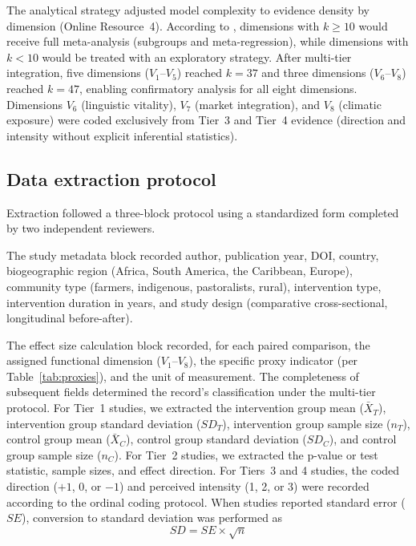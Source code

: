 \documentclass[12pt,a4paper]{article}
\begin{document}
The analytical strategy adjusted model complexity to evidence density by dimension (Online Resource~4). According to \citet{Borenstein2009}, dimensions with $k \geq 10$ would receive full meta-analysis (subgroups and meta-regression), while dimensions with $k < 10$ would be treated with an exploratory strategy. After multi-tier integration, five dimensions ($V_1$--$V_5$) reached $k = 37$ and three dimensions ($V_6$--$V_8$) reached $k = 47$, enabling confirmatory analysis for all eight dimensions. Dimensions $V_6$ (linguistic vitality), $V_7$ (market integration), and $V_8$ (climatic exposure) were coded exclusively from Tier~3 and Tier~4 evidence (direction and intensity without explicit inferential statistics).

\subsection{Data extraction protocol}
\label{sec:extraction}

Extraction followed a three-block protocol using a standardized form completed by two independent reviewers.

The study metadata block recorded author, publication year, DOI, country, biogeographic region (Africa, South America, the Caribbean, Europe), community type (farmers, indigenous, pastoralists, rural), intervention type, intervention duration in years, and study design (comparative cross-sectional, longitudinal before-after).

The effect size calculation block recorded, for each paired comparison, the assigned functional dimension ($V_1$--$V_8$), the specific proxy indicator (per Table~\ref{tab:proxies}), and the unit of measurement. The completeness of subsequent fields determined the record's classification under the multi-tier protocol. For Tier~1 studies, we extracted the intervention group mean ($\bar{X}_T$), intervention group standard deviation ($SD_T$), intervention group sample size ($n_T$), control group mean ($\bar{X}_C$), control group standard deviation ($SD_C$), and control group sample size ($n_C$). For Tier~2 studies, we extracted the p-value or test statistic, sample sizes, and effect direction. For Tiers~3 and 4 studies, the coded direction ($+1$, $0$, or $-1$) and perceived intensity (1, 2, or 3) were recorded according to the ordinal coding protocol. When studies reported standard error ($SE$), conversion to standard deviation was performed as
%
\begin{equation}
SD = SE \times \sqrt{n}
\label{eq:sd-ep}
\end{equation}
\end{document}
